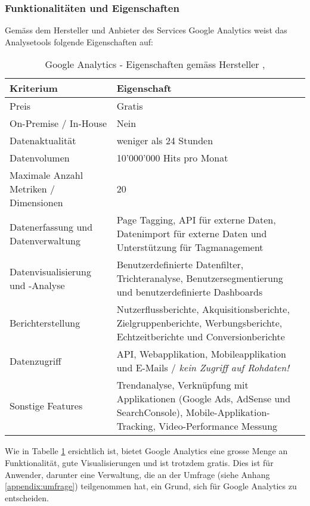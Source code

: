 \subsubsection{Funktionalitäten und Eigenschaften}
Gemäss dem Hersteller und Anbieter des Services Google Analytics weist das Analysetools folgende Eigenschaften auf:

\begin{table}[h]
	\centering
	\begin{tabular}{ | p{4cm} | p{10cm} |}
		\hline
		\textbf{Kriterium} & \textbf{Eigenschaft}  \\ 
		\hline
		Preis & Gratis \\
    \hline
    On-Premise / In-House & Nein \\
    \hline
    Datenaktualität & weniger als 24 Stunden \\
    \hline
    Datenvolumen & 10'000'000 Hits pro Monat\\
    \hline
    Maximale Anzahl Metriken / Dimensionen & 20\\
    \hline
    Datenerfassung und Datenverwaltung &  Page Tagging, API für externe Daten, Datenimport für externe Daten und Unterstützung für Tagmanagement\\
    \hline
    Datenvisualisierung und -Analyse & Benutzerdefinierte Datenfilter, Trichteranalyse, Benutzersegmentierung und benutzerdefinierte Dashboards\\
    \hline
    Berichterstellung & Nutzerflussberichte, Akquisitionsberichte, Zielgruppenberichte, Werbungsberichte, Echtzeitberichte und Conversionberichte \\
    \hline
    Datenzugriff & API, Webapplikation, Mobileapplikation und E-Mails / \textit{kein Zugriff auf Rohdaten!}\\
    \hline
    Sonstige Features & Trendanalyse, Verknüpfung mit Applikationen (Google Ads, AdSense und SearchConsole), Mobile-Applikation-Tracking, Video-Performance Messung\\
		\hline  
	\end{tabular}
	\caption{Google Analytics - Eigenschaften gemäss Hersteller \parencite {GoogleAnalyticsCompare}, \parencite{GoogleAnalyticsFeatures}}
	\label{tab: googleAnalyticsFeatures}
\end{table}

Wie in Tabelle \ref{tab: googleAnalyticsFeatures} ersichtlich ist, bietet Google Analytics eine grosse Menge an Funktionalität, gute Visualisierungen und ist trotzdem gratis. Dies ist für Anwender, darunter eine Verwaltung, die an der Umfrage (siehe Anhang \ref{appendix:umfrage}) teilgenommen hat, ein Grund, sich für Google Analytics zu entscheiden. 

